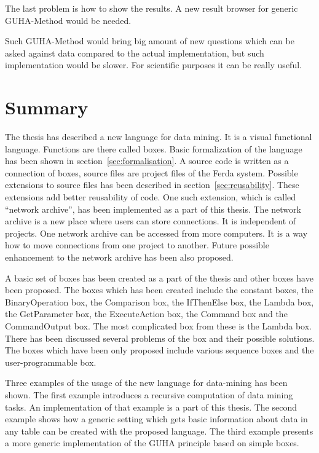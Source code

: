 \documentclass[a4paper,12pt]{book}
\begin{document}
The last problem is how to show the results. A new result browser for generic GUHA-Method would be needed.

Such GUHA-Method would bring big amount of new questions which can be asked against data compared to the actual implementation, but such implementation would be slower. For scientific purposes it can be really useful.

\chapter{Summary}
The thesis has described a new language for data mining. It is a visual functional language. Functions are there called boxes. Basic formalization of the language has been shown in section~\ref{sec:formalisation}. A source code is written as a connection of boxes, source files are project files of the Ferda system. Possible extensions to source files has been described in section~\ref{sec:reusability}. These extensions add better reusability of code. One such extension, which is called ``network archive'', has been implemented as a part of this thesis. The network archive is a new place where users can store connections. It is independent of projects. One network archive can be accessed from more computers. It is a way how to move connections from one project to another. Future possible enhancement to the network archive has been also proposed.

A basic set of boxes has been created as a part of the thesis and other boxes have been proposed. The boxes which has been created include the constant boxes, the BinaryOperation box, the Comparison box, the IfThenElse box, the Lambda box, the GetParameter box, the ExecuteAction box, the Command box and the CommandOutput box. The most complicated box from these is the Lambda box. There has been discussed several problems of the box and their possible solutions. The boxes which have been only proposed include various sequence boxes and the user-programmable box.

Three examples of the usage of the new language for data-mining has been shown. The first example introduces a recursive computation of data mining tasks. An implementation of that example is a part of this thesis. The second example shows how a generic setting which gets basic information about data in any table can be created with the proposed language. The third example presents a more generic implementation of the GUHA principle based on simple boxes.

\end{document}

